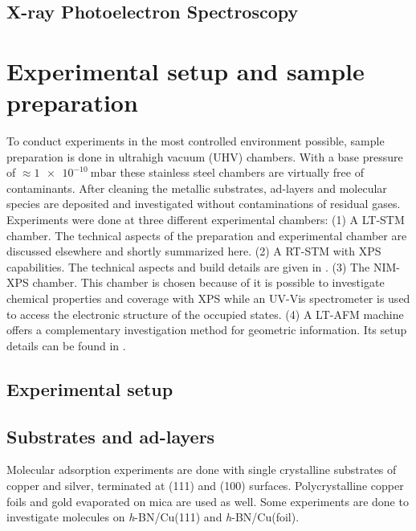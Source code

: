 \documentclass[
10pt,					%
a4paper,				%
twoside,				%
BCOR=8mm,				%
headings=normal,		%
headsepline,			%
footsepline,			%
plainfootsepline,		%
]{scrbook}
\begin{document}
  \section{\textbf{X}-ray \textbf{P}hotoelectron \textbf{S}pectroscopy}
	

\chapter{Experimental setup and sample preparation}
To conduct experiments in the most controlled environment possible, sample preparation is done in ultrahigh vacuum (UHV) chambers. With a base pressure of $\approx \SI{1e-10}{\milli \bar}$ these stainless steel chambers are virtually free of contaminants. After cleaning the metallic substrates, ad-layers and molecular species are deposited and investigated without contaminations of residual gases.  Experiments were done at three different experimental chambers: (1) A LT-STM chamber. The technical aspects of the preparation and experimental chamber are discussed elsewhere \cite{urgel_tendero_two-dimensional_2015, schwarz_assembly_2018, wiengarten_scanning_2015} and shortly summarized here. (2) A RT-STM with XPS capabilities. The technical aspects and build details are given in \cite{schwarz_assembly_2018}. (3) The NIM-XPS chamber. This chamber is chosen because of it is possible to investigate chemical properties and coverage with XPS while an UV-Vis spectrometer is used to access the electronic structure of the occupied states. (4) A LT-AFM machine offers a complementary investigation method for geometric information. Its setup details can be found in \cite{he_bottom-up_2017}.



  \section{Experimental setup}
    
  \section{Substrates and ad-layers}
Molecular adsorption experiments are done with single crystalline substrates of copper and silver, terminated at (111) and (100) surfaces. Polycrystalline copper foils and gold evaporated on mica are used as well. Some experiments are done to investigate molecules on \textit{h}-BN/Cu(111) and \textit{h}-BN/Cu(foil). 
\end{document}

